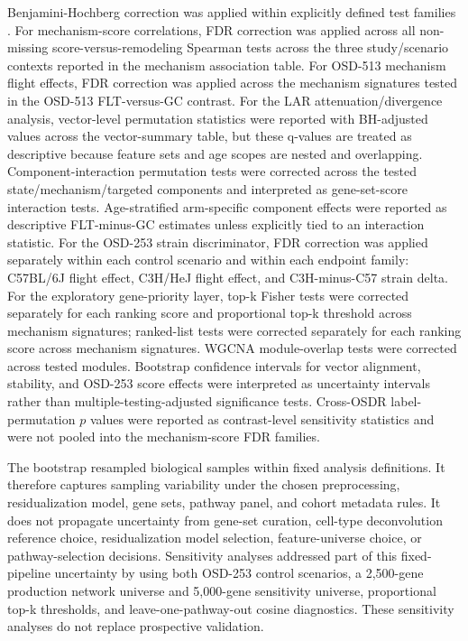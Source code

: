 \documentclass[11pt]{article}
\begin{document}
Benjamini-Hochberg correction was applied within explicitly defined test families \citep{benjamini1995controlling}. For mechanism-score correlations, FDR correction was applied across all non-missing score-versus-remodeling Spearman tests across the three study/scenario contexts reported in the mechanism association table. For OSD-513 mechanism flight effects, FDR correction was applied across the mechanism signatures tested in the OSD-513 FLT-versus-GC contrast. For the LAR attenuation/divergence analysis, vector-level permutation statistics were reported with BH-adjusted values across the vector-summary table, but these q-values are treated as descriptive because feature sets and age scopes are nested and overlapping. Component-interaction permutation tests were corrected across the tested state/mechanism/targeted components and interpreted as gene-set-score interaction tests. Age-stratified arm-specific component effects were reported as descriptive FLT-minus-GC estimates unless explicitly tied to an interaction statistic. For the OSD-253 strain discriminator, FDR correction was applied separately within each control scenario and within each endpoint family: C57BL/6J flight effect, C3H/HeJ flight effect, and C3H-minus-C57 strain delta. For the exploratory gene-priority layer, top-k Fisher tests were corrected separately for each ranking score and proportional top-k threshold across mechanism signatures; ranked-list tests were corrected separately for each ranking score across mechanism signatures. WGCNA module-overlap tests were corrected across tested modules. Bootstrap confidence intervals for vector alignment, stability, and OSD-253 score effects were interpreted as uncertainty intervals rather than multiple-testing-adjusted significance tests. Cross-OSDR label-permutation $p$ values were reported as contrast-level sensitivity statistics and were not pooled into the mechanism-score FDR families.

The bootstrap resampled biological samples within fixed analysis definitions. It therefore captures sampling variability under the chosen preprocessing, residualization model, gene sets, pathway panel, and cohort metadata rules. It does not propagate uncertainty from gene-set curation, cell-type deconvolution reference choice, residualization model selection, feature-universe choice, or pathway-selection decisions. Sensitivity analyses addressed part of this fixed-pipeline uncertainty by using both OSD-253 control scenarios, a 2,500-gene production network universe and 5,000-gene sensitivity universe, proportional top-k thresholds, and leave-one-pathway-out cosine diagnostics. These sensitivity analyses do not replace prospective validation.
\end{document}
